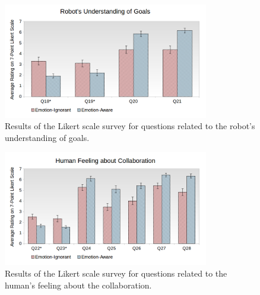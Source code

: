 \documentclass[12pt]{report}
\begin{document}
\begin{figure}
\centering
\includegraphics[width=0.8\textwidth]{figure/Overall-Goals.png}
\caption{Results of the Likert scale survey for questions related to the robot's
understanding of goals.}
\label{fig:overall-goals}
\end{figure}

\begin{figure}
\centering
\includegraphics[width=0.8\textwidth]{figure/Overall-Collaboration.png}
\caption{Results of the Likert scale survey for questions related to the human's
feeling about the collaboration.}
\label{fig:overall-collaboration}
\end{figure}
\end{document}

